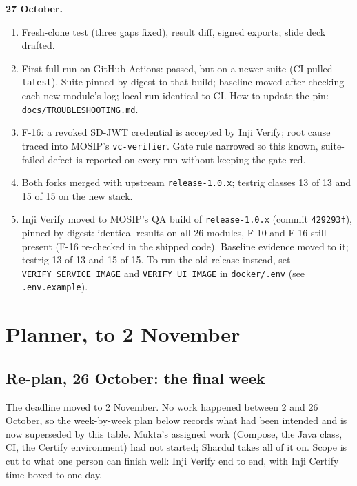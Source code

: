 \documentclass[10pt,a4paper]{article}
\newcommand{\tightlist}{\setlength{\itemsep}{1pt}\setlength{\parskip}{0pt}\setlength{\parsep}{0pt}}
\begin{document}
\noindent\textbf{27 October.}
\begin{enumerate}\tightlist
  \item Fresh-clone test (three gaps fixed), result diff, signed exports; slide deck drafted.
  \item First full run on GitHub Actions: passed, but on a newer suite (CI pulled
        \texttt{latest}). Suite pinned by digest to that build; baseline moved after checking each
        new module's log; local run identical to CI. How to update the pin:
        \texttt{docs/TROUBLESHOOTING.md}.
  \item F-16: a revoked SD-JWT credential is accepted by Inji Verify; root cause traced into
        MOSIP's \texttt{vc-verifier}. Gate rule narrowed so this known, suite-failed defect is
        reported on every run without keeping the gate red.
  \item Both forks merged with upstream \texttt{release-1.0.x}; testrig classes 13 of 13 and
        15 of 15 on the new stack.
  \item Inji Verify moved to MOSIP's QA build of \texttt{release-1.0.x} (commit \texttt{429293f}),
        pinned by digest: identical results on all 26 modules, F-10 and F-16 still present
        (F-16 re-checked in the shipped code). Baseline evidence moved to it; testrig 13 of 13
        and 15 of 15. To run the old release instead, set \texttt{VERIFY\_SERVICE\_IMAGE} and
        \texttt{VERIFY\_UI\_IMAGE} in \texttt{docker/.env} (see \texttt{.env.example}).
\end{enumerate}

\newpage
\section{Planner, to 2 November}

\subsection{Re-plan, 26 October: the final week}

The deadline moved to 2 November. No work happened between 2 and 26 October, so the
week-by-week plan below records what had been intended and is now superseded by this
table. Mukta's assigned work (Compose, the Java class, CI, the Certify environment) had not
started; Shardul takes all of it on. Scope is cut to what one person can finish well:
Inji Verify end to end, with Inji Certify time-boxed to one day.
\end{document}
